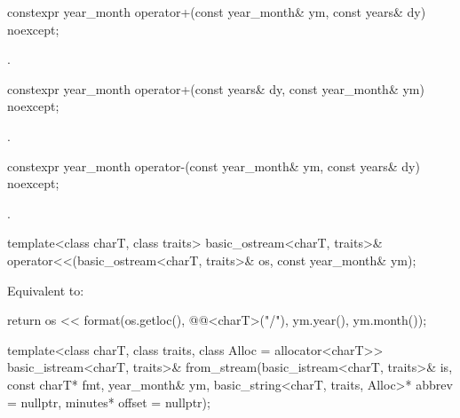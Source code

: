 %
\begin{itemdecl}
constexpr year_month operator+(const year_month& ym, const years& dy) noexcept;
\end{itemdecl}

\begin{itemdescr}
\pnum
\returns
{}.
\end{itemdescr}

%
\begin{itemdecl}
constexpr year_month operator+(const years& dy, const year_month& ym) noexcept;
\end{itemdecl}

\begin{itemdescr}
\pnum
\returns
{}.
\end{itemdescr}

%
\begin{itemdecl}
constexpr year_month operator-(const year_month& ym, const years& dy) noexcept;
\end{itemdecl}

\begin{itemdescr}
\pnum
\returns
{}.
\end{itemdescr}

%
\begin{itemdecl}
template<class charT, class traits>
  basic_ostream<charT, traits>&
    operator<<(basic_ostream<charT, traits>& os, const year_month& ym);
\end{itemdecl}

\begin{itemdescr}
\pnum
\effects
Equivalent to:
\begin{codeblock}
return os << format(os.getloc(), @@<charT>("{}/{}"),
                    ym.year(), ym.month());
\end{codeblock}
\end{itemdescr}

%
\begin{itemdecl}
template<class charT, class traits, class Alloc = allocator<charT>>
  basic_istream<charT, traits>&
    from_stream(basic_istream<charT, traits>& is, const charT* fmt,
                year_month& ym, basic_string<charT, traits, Alloc>* abbrev = nullptr,
                minutes* offset = nullptr);
\end{itemdecl}

